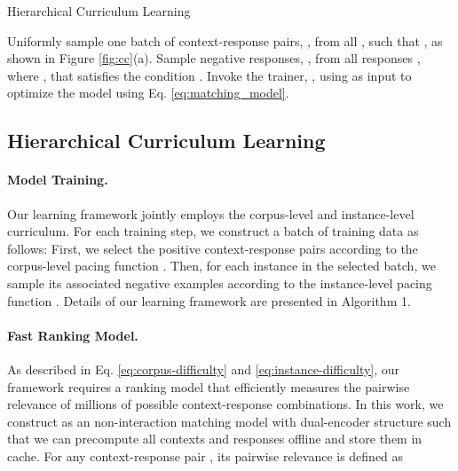 \documentclass[11pt,a4paper]{article}
\makeatletter
\newcommand{\nosemic}{\renewcommand{\@endalgocfline}{\relax}}\newcommand{\dosemic}{\renewcommand{\@endalgocfline}{\algocf@endline}}\newcommand{\pushline}{\Indp}\newcommand{\popline}{\Indm\dosemic}\let\oldnl\nl \newcommand{\nonl}{\renewcommand{\nl}{\let\nl\oldnl}}\makeatother
\makeatother
\begin{document}
\normalem
\begin{algorithm}[t]
    \caption{Hierarchical Curriculum Learning}
    

      {
        \nosemic Uniformly sample one batch of context-response pairs, , from all , such that , as shown in Figure \ref{fig:cc}(a).\;
        {
            \nosemic Sample  negative responses, , from all responses , where , that satisfies the condition . 
        }
        Invoke the trainer, , using  as input to optimize the model using Eq. \eqref{eq:matching_model}.
      }
\end{algorithm}

\subsection{Hierarchical Curriculum Learning}
\label{sec:ranker}


\paragraph{Model Training.} Our learning framework jointly employs the corpus-level and instance-level curriculum.
For each training step, we construct a batch of training data as follows: First, we select the positive context-response pairs according to the corpus-level pacing function . Then, for each instance in the selected batch, we sample its associated negative examples according to the instance-level pacing function . Details of our learning framework are presented in Algorithm 1.


\paragraph{Fast Ranking Model.} As described in Eq. \eqref{eq:corpus-difficulty} and \eqref{eq:instance-difficulty}, our framework requires a ranking model  that efficiently measures the pairwise relevance of millions of possible context-response combinations. In this work, we construct  as
an non-interaction matching model with dual-encoder structure such that we can precompute all contexts and responses offline and store them in cache. For any context-response pair , 
its pairwise relevance  is defined as 
\end{document}
